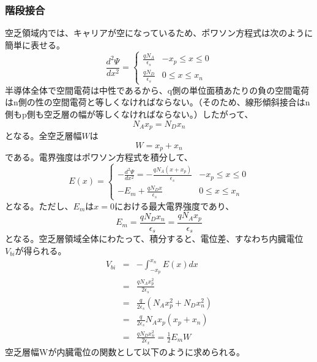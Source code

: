 \documentclass[10pt]{ujarticle}
\begin{document}
\subsubsection{階段接合}
空乏領域内では、キャリアが空になっているため、ポワソン方程式は次のように簡単に表せる。
\begin{equation}
  \frac{d^2 \Psi}{dx^2} =
  \begin{cases}
    \frac{qN_A}{\epsilon_s} & -x_p \leq x \leq 0 \\
    \frac{qN_D}{\epsilon_s} & 0 \leq x \leq x_n
  \end{cases}
\end{equation}
半導体全体で空間電荷は中性であるから、q側の単位面積あたりの負の空間電荷はn側の性の空間電荷と等しくなければならない。（そのため、線形傾斜接合はn側もp側も空乏層の幅が等しくなければならない。）したがって、
\begin{equation}
  N_A x_p = N_D x_n
\end{equation}
となる。全空乏層幅$W$は
\begin{equation}
  W = x_p + x_n
\end{equation}
である。電界強度はポワソン方程式を積分して、
\begin{equation}
  E(x) =
  \begin{cases}
    -\frac{d^2 \Psi}{dx^2} = -\frac{qN_A(x+x_p)}{\epsilon_s} & -x_p \leq x \leq 0\\
    -E_m + \frac{qN_D x}{\epsilon_s} & 0 \leq x \leq x_n
  \end{cases}
\end{equation}
となる。ただし、$E_m$は$x=0$における最大電界強度であり、
\begin{equation}
  E_m = \frac{q N_D x_n}{\epsilon_s} = \frac{q N_A x_p}{\epsilon_s}
\end{equation}
となる。空乏層領域全体にわたって、積分すると、電位差、すなわち内臓電位$V_{bi}$が得られる。
\begin{eqnarray}
  V_{bi} &=& - \int_{-x_p}^{x_n} E(x) dx \nonumber \\
  &=& \frac{qN_A x^2_p}{2 \epsilon_s} \nonumber \\
  &=& \frac{q}{2\epsilon_s} (N_A x^2_p + N_D x^2_n)\\
  &=& \frac{q}{2\epsilon_s} N_A x_p (x_p + x_n) \nonumber \\
  &=& \frac{qN_D x^2_n}{2 \epsilon_x} = \frac{1}{2} E_m W
\end{eqnarray}
空乏層幅Wが内臓電位の関数として以下のように求められる。
\end{document}
